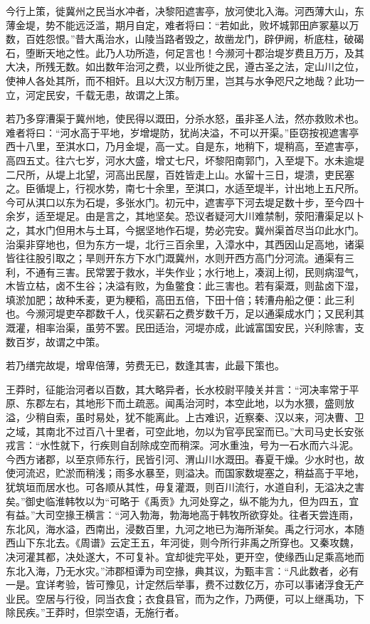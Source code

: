 \documentclass[]{article}
\begin{document}
今行上策，徙冀州之民当水冲者，决黎阳遮害亭，放河使北入海。河西薄大山，东薄金堤，势不能远泛滥，期月自定，难者将曰：``若如此，败坏城郭田庐冢墓以万数，百姓怨恨。''昔大禹治水，山陵当路者毁之，故凿龙门，辟伊阙，析底柱，破碣石，堕断天地之性。此乃人功所造，何足言也！今濒河十郡治堤岁费且万万，及其大决，所残无数。如出数年治河之费，以业所徙之民，遵古圣之法，定山川之位，使神人各处其所，而不相奸。且以大汉方制万里，岂其与水争咫尺之地哉？此功一立，河定民安，千载无患，故谓之上策。

若乃多穿漕渠于冀州地，使民得以溉田，分杀水怒，虽非圣人法，然亦救败术也。难者将曰：``河水高于平地，岁增堤防，犹尚决溢，不可以开渠。''臣窃按视遮害亭西十八里，至淇水口，乃月金堤，高一丈。自是东，地稍下，堤稍高，至遮害亭，高四五丈。往六七岁，河水大盛，增丈七尺，坏黎阳南郭门，入至堤下。水未逾堤二尺所，从堤上北望，河高出民屋，百姓皆走上山。水留十三日，堤溃，吏民塞之。臣循堤上，行视水势，南七十余里，至淇口，水适至堤半，计出地上五尺所。今可从淇口以东为石堤，多张水门。初元中，遮害亭下河去堤足数十步，至今四十余岁，适至堤足。由是言之，其地坚矣。恐议者疑河大川难禁制，荥阳漕渠足以卜之，其水门但用木与土耳，今据坚地作石堤，势必完安。冀州渠首尽当卬此水门。治渠非穿地也，但为东方一堤，北行三百余里，入漳水中，其西因山足高地，诸渠皆往往股引取之；旱则开东方下水门溉冀州，水则开西方高门分河流。通渠有三利，不通有三害。民常罢于救水，半失作业；水行地上，凑润上彻，民则病湿气，木皆立枯，卤不生谷；决溢有败，为鱼鳖食：此三害也。若有渠溉，则盐卤下湿，填淤加肥；故种禾麦，更为粳稻，高田五倍，下田十倍；转漕舟船之便：此三利也。今濒河堤吏卒郡数千人，伐买薪石之费岁数千万，足以通渠成水门；又民利其溉灌，相率治渠，虽劳不罢。民田适治，河堤亦成，此诚富国安民，兴利除害，支数百岁，故谓之中策。

若乃缮完故堤，增卑倍薄，劳费无已，数逢其害，此最下策也。

王莽时，征能治河者以百数，其大略异者，长水校尉平陵关并言：``河决率常于平原、东郡左右，其地形下而土疏恶。闻禹治河时，本空此地，以为水猥，盛则放溢，少稍自索，虽时易处，犹不能离此。上古难识，近察秦、汉以来，河决曹、卫之域，其南北不过百八十里者，可空此地，勿以为官亭民室而已。''大司马史长安张戎言：``水性就下，行疾则自刮除成空而稍深。河水重浊，号为一石水而六斗泥。今西方诸郡，以至京师东行，民皆引河、渭山川水溉田。春夏干燥。少水时也，故使河流迟，贮淤而稍浅；雨多水暴至，则溢决。而国家数堤塞之，稍益高于平地，犹筑垣而居水也。可各顺从其性，毋复灌溉，则百川流行，水道自利，无溢决之害矣。''御史临淮韩牧以为``可略于《禹贡》九河处穿之，纵不能为九，但为四五，宜有益。''大司空掾王横言：``河入勃海，勃海地高于韩牧所欲穿处。往者天尝连雨，东北风，海水溢，西南出，浸数百里，九河之地已为海所渐矣。禹之行河水，本随西山下东北去。《周谱》云定王五，年河徙，则今所行非禹之所穿也。又秦攻魏，决河灌其都，决处遂大，不可复补。宜却徙完平处，更开空，使缘西山足乘高地而东北入海，乃无水灾。''沛郡桓谭为司空掾，典其议，为甄丰言：``凡此数者，必有一是。宜详考验，皆可豫见，计定然后举事，费不过数亿万，亦可以事诸浮食无产业民。空居与行役，同当衣食；衣食县官，而为之作，乃两便，可以上继禹功，下除民疾。''王莽时，但崇空语，无施行者。
\end{document}

